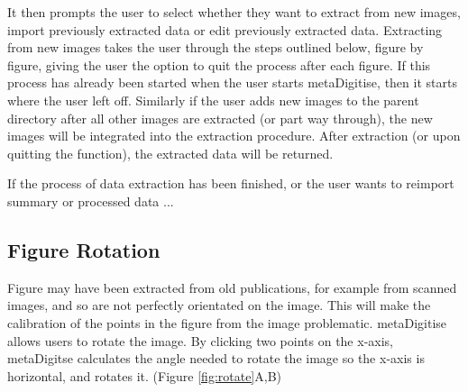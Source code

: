 \documentclass{article}
\begin{document}
It then prompts the user to select whether they want to extract from new images, import previously extracted data or edit previously extracted data. Extracting from new images takes the user through the steps outlined below, figure by figure, giving the user the option to quit the process after each figure. If this process has already been started when the user starts metaDigitise, then it starts where the user left off. Similarly if the user adds new images to the parent directory after all other images are extracted (or part way through), the new images will be integrated into the extraction procedure. After extraction (or upon quitting the function), the extracted data will be returned. %


If the process of data extraction has been finished, or the user wants to reimport summary or processed data ...






\subsection{Figure Rotation}
Figure may have been extracted from old publications, for example from scanned images, and so are not perfectly orientated on the image. This will make the calibration of the points in the figure from the image problematic. metaDigitise allows users to rotate the image. By clicking two points on the x-axis, metaDigitse calculates the angle needed to rotate the image so the x-axis is horizontal, and rotates it. (Figure \ref{fig:rotate}A,B)
\end{document}
